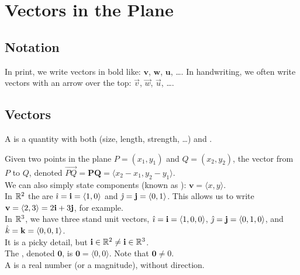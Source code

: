 \section{Vectors in the Plane}

\subsection{Notation}

In print, we write vectors in bold like: $\mathbf{v}$, $\mathbf{w}$, $\mathbf{u}$, \dots.  In handwriting, we often write vectors with an arrow over the top: $\vec{v}$, $\vec{w}$, $\vec{u}$, \dots.

\subsection{Vectors}

A  is a quantity with both  (size, length, strength, \dots) and .

Given two points in the plane \(P = (x_{1},y_{1})\) and \(Q = (x_{2},y_{2})\), the vector from \(P\) to \(Q\), denoted \(\overrightarrow{PQ} = \mathbf{PQ} = \langle x_{2}-x_{1},y_{2}-y_{1}\rangle\). \\

We can also simply state components (known as ): \(\mathbf{v} = \langle x, y\rangle\). \\

In \(\mathbb{R}^{2}\) the  are \(\hat{\imath} = \mathbf{i} = \left\langle 1,0 \right\rangle\) and \(\hat{\jmath} = \mathbf{j} = \left\langle 0,1 \right\rangle\). This allows us to write \(\mathbf{v} = \left\langle 2,3 \right\rangle = 2\mathbf{i} + 3\mathbf{j}\), for example. \\

In \(\mathbb{R}^{3}\), we have three stand unit vectors, \(\hat{\imath} = \mathbf{i} = \left\langle 1,0,0 \right\rangle\), \(\hat{\jmath} = \mathbf{j} = \left\langle 0,1,0 \right\rangle\), and \(\hat{k} = \mathbf{k} = \left\langle 0,0,1 \right\rangle\).  \\

It is a picky detail, but \(\mathbf{i} \in \mathbb{R}^{2} \ne \mathbf{i} \in \mathbb{R}^{3}\). \\

The , denoted \(\mathbf{0}\), is \(\mathbf{0} = \langle 0,0 \rangle\). Note that \(\mathbf{0} \ne 0\). \\

A  is a real number (or a magnitude), without direction. \\


